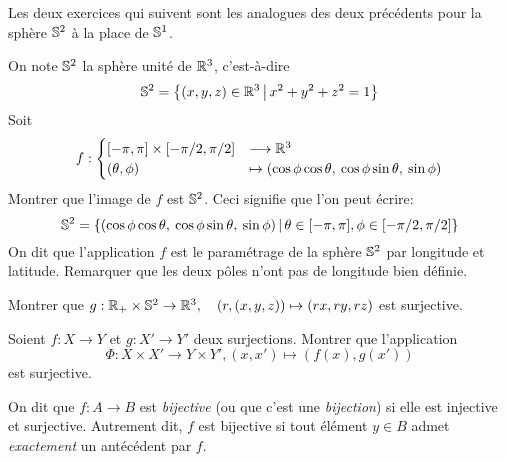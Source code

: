 Les deux exercices qui suivent sont les analogues des deux précédents pour la sphère $\S^2$ à la place de $\S^1$.

\begin{exercice}\label{exo-coord-spheriques-sphere}
On note $\S^2$ la sphère unité de $\R^3$, c'est-à-dire 
\[ \S^2 = \ensemble{(x,y,z)\in\R^3}{x^2+y^2+z^2=1}\]
Soit 
\[ f : 
\begin{cases}
 [-\pi,\pi] \times [-\pi/2,\pi/2] &\longrightarrow \R^3\\
(\theta,\phi) &\mapsto (\cos\phi\cos\theta,\: \cos\phi\sin\theta, \: \sin\phi)
\end{cases}
\]
Montrer que l'image de $f$ est $\S^2$. Ceci signifie que l'on peut écrire:
\[ \S^2 = \ensemble{(\cos\phi\cos\theta,\: \cos\phi\sin\theta, \: \sin\phi)}{\theta\in [-\pi,\pi], \phi\in [-\pi/2,\pi/2]}
\]
On dit que l'application $f$ est le paramétrage de la sphère $\S^2$ par longitude et latitude. Remarquer que les deux pôles n'ont pas de longitude bien définie.
\end{exercice}

\begin{exercice}\label{exo-decomp-spherique}
Montrer que $g : \R_+\times \S^2 \to \R^3, \quad (r,(x,y,z))\mapsto (rx,ry,rz)$ est surjective.
\end{exercice}

\begin{exercice}\label{exo-produit-surjections}
Soient $f:X\to Y$ et $g:X'\to Y'$ deux surjections. Montrer que l'application
\[ 
\Phi : X\times X' \to Y\times Y', (x,x') \mapsto (f(x),g(x'))
\]
est surjective.
\end{exercice}




\begin{definition}
On dit que $f : A\to B$ est \emph{bijective} (ou que c'est une \emph{bijection}) si elle est injective et surjective. Autrement dit, $f$ est bijective si tout élément $y\in B$ admet \emph{exactement} un antécédent par $f$.
\end{definition}

